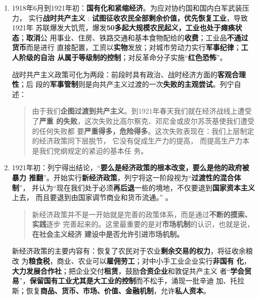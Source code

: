 \begin{enumerate}
\begin{enumerate}
  \end{enumerate}

\item 1918年6月到1921年初：\textbf{国有化和紧缩经济}。为应对协约国和国内白军武装压力，
  实行\textbf{战时共产主义} : \textbf{试图征收农民全部剩余价值，优先恢复工业}，导致1921年
  苏联爆发大饥荒，爆发\textbf{50多起大规模农民起义，工业也处于瘫痪状态}；\textbf{取消}公
  用事业、住房、铁路交通和基本食物配给的\textbf{收费}；工业品\textbf{不通过货币}而是进行
  直接配置，工资以\textbf{实物}发放；对城市劳动力实行\textbf{军事纪律}；\textbf{工人阶级的自治
    从属于等级制的控制}；对反革命分子实施“\textbf{红色恐怖}”。

  战时共产主义政策可化为两段：前段时具有政治、战时经济方面的\textbf{客观合理性}；后
  段的\textbf{军事管制}则是向共产主义过渡的一次\textbf{失败的主观尝试}。列宁自述：
  \begin{quotation}
    由于我们\textbf{企图过渡到共产主义}。到1921年春天我们就在经济战线上遭受了\textbf{严重
      的失败}，这次失败比高尔察克、邓尼金或皮尔苏茨基使我们遭受的任何失败都
    要\textbf{严重得多，危险得多}。这次失败表现在：我们上层制定的经济政策同下层脱节，
    它没有促成生产力的提高， 而提高生产力本是我们党纲规定的紧迫的基本任
    务。
  \end{quotation}

\item 1921年初：列宁得出结论，“\textbf{要么是经济政策的根本改变，要么是他的政府被暴力
    推翻}”。开始实行\textbf{新经济政策}，列宁将这一阶段视为“\textbf{过渡性的混合体制}”，
  并认为“现在我们处于必须\textbf{再后退}一些的境地，不仅要退到\textbf{国家资本主义}上去，
  而且要退到由国家调节商业和货币流通。” 。


  \begin{quotation}
    新经济政策并不是一开始就是完善的政策体系，而是通过\textbf{不断的摸索、实践}逐步
    完善起来的。这里最重要的是对\textbf{市场机制}的认识，也就是说，\textbf{在社会主义经济
      建设中是否允许引进市场机制。}
  \end{quotation}

  新经济政策的主要内容有：恢复了农民对于农业\textbf{剩余交易的权力}，将征收余粮改
  为\textbf{粮食税}，商业、农业可以\textbf{雇佣劳工}；对中小手工业企业实行\textbf{非国有
    化}，\textbf{大力发展合作社}；把企业交付\textbf{租赁}，鼓励\textbf{合资企业}和敦促共产主义
  者“\textbf{学会贸易}”，\textbf{保留国有工业尤其是大工业的控制}而不松手，涌现一批辛迪
  加、托拉斯；恢复\textbf{商品、货币、市场、价值、金融机制}，允许\textbf{私人资本}。


\end{enumerate}
